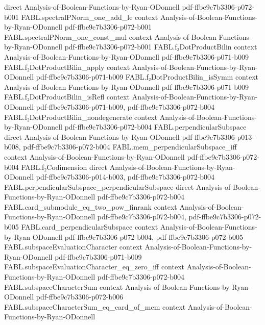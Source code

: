 \begin{theorem}
  {direct}
  {Analysis-of-Boolean-Functions-by-Ryan-ODonnell}
  {pdf-ffbe9c7b3306-p072-b001}
\proofstep
  {FABL.spectralPNorm_one_add_le}
  {context}
  {Analysis-of-Boolean-Functions-by-Ryan-ODonnell}
  {pdf-ffbe9c7b3306-p072-b001}
\proofstep
  {FABL.spectralPNorm_one_const_mul}
  {context}
  {Analysis-of-Boolean-Functions-by-Ryan-ODonnell}
  {pdf-ffbe9c7b3306-p072-b001}
\proofstep
  {FABL.f₂DotProductBilin}
  {context}
  {Analysis-of-Boolean-Functions-by-Ryan-ODonnell}
  {pdf-ffbe9c7b3306-p071-b009}
\proofstep
  {FABL.f₂DotProductBilin_apply}
  {context}
  {Analysis-of-Boolean-Functions-by-Ryan-ODonnell}
  {pdf-ffbe9c7b3306-p071-b009}
\proofstep
  {FABL.f₂DotProductBilin_isSymm}
  {context}
  {Analysis-of-Boolean-Functions-by-Ryan-ODonnell}
  {pdf-ffbe9c7b3306-p071-b009}
\proofstep
  {FABL.f₂DotProductBilin_isRefl}
  {context}
  {Analysis-of-Boolean-Functions-by-Ryan-ODonnell}
  {pdf-ffbe9c7b3306-p071-b009,
    pdf-ffbe9c7b3306-p072-b004}
\proofstep
  {FABL.f₂DotProductBilin_nondegenerate}
  {context}
  {Analysis-of-Boolean-Functions-by-Ryan-ODonnell}
  {pdf-ffbe9c7b3306-p072-b004}
\proofstep
  {FABL.perpendicularSubspace}
  {direct}
  {Analysis-of-Boolean-Functions-by-Ryan-ODonnell}
  {pdf-ffbe9c7b3306-p013-b008,
    pdf-ffbe9c7b3306-p072-b004}
\proofstep
  {FABL.mem_perpendicularSubspace_iff}
  {context}
  {Analysis-of-Boolean-Functions-by-Ryan-ODonnell}
  {pdf-ffbe9c7b3306-p072-b004}
\proofstep
  {FABL.f₂Codimension}
  {direct}
  {Analysis-of-Boolean-Functions-by-Ryan-ODonnell}
  {pdf-ffbe9c7b3306-p014-b003,
    pdf-ffbe9c7b3306-p072-b004}
\proofstep
  {FABL.perpendicularSubspace_perpendicularSubspace}
  {direct}
  {Analysis-of-Boolean-Functions-by-Ryan-ODonnell}
  {pdf-ffbe9c7b3306-p072-b004}
\proofstep
  {FABL.card_submodule_eq_two_pow_finrank}
  {context}
  {Analysis-of-Boolean-Functions-by-Ryan-ODonnell}
  {pdf-ffbe9c7b3306-p072-b004,
    pdf-ffbe9c7b3306-p072-b005}
\proofstep
  {FABL.card_perpendicularSubspace}
  {context}
  {Analysis-of-Boolean-Functions-by-Ryan-ODonnell}
  {pdf-ffbe9c7b3306-p072-b004,
    pdf-ffbe9c7b3306-p072-b005}
\proofstep
  {FABL.subspaceEvaluationCharacter}
  {context}
  {Analysis-of-Boolean-Functions-by-Ryan-ODonnell}
  {pdf-ffbe9c7b3306-p071-b009}
\proofstep
  {FABL.subspaceEvaluationCharacter_eq_zero_iff}
  {context}
  {Analysis-of-Boolean-Functions-by-Ryan-ODonnell}
  {pdf-ffbe9c7b3306-p072-b004}
\proofstep
  {FABL.subspaceCharacterSum}
  {context}
  {Analysis-of-Boolean-Functions-by-Ryan-ODonnell}
  {pdf-ffbe9c7b3306-p072-b006}
\proofstep
  {FABL.subspaceCharacterSum_eq_card_of_mem}
  {context}
  {Analysis-of-Boolean-Functions-by-Ryan-ODonnell}

\end{theorem}
